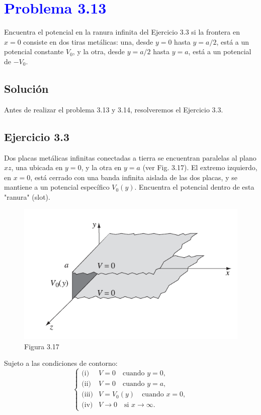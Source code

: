 \documentclass[12pt]{article}
\newcommand{\question}[1]{\textcolor{blue}{\textbf{#1}}}
\begin{document}


\section*{\question{Problema 3.13}}

Encuentra el potencial en la ranura infinita del Ejercicio 3.3 si la frontera en \(x=0\) consiste en dos tiras metálicas: una, desde \(y=0\) hasta \(y=a/2\), está a un potencial constante \( V_0\), y la otra, desde \(y=a/2\) hasta \(y=a\), está a un potencial de \( -V_0 \).

\subsection*{Solución}
Antes de realizar el problema 3.13 y 3.14, resolveremos el Ejercicio 3.3.

\subsection*{Ejercicio 3.3}
Dos placas metálicas infinitas conectadas a tierra se encuentran paralelas al plano \(xz\), una ubicada en \(y=0\), y la otra en \(y=a\) (ver Fig. 3.17). El extremo izquierdo, en \(x=0\), está cerrado con una banda infinita aislada de las dos placas, y se mantiene a un potencial específico \( V_0(y)\). Encuentra el potencial dentro de esta "ranura" (slot).

\begin{figure}[h]
    \centering
    \includegraphics[width=0.75\linewidth]{imagenes/Fig 3.17.PNG}
    \caption*{Figura 3.17}
    \label{fig:enter-label}
\end{figure}

Sujeto a las condiciones de contorno:
\[
\left\{
\begin{array}{ll}
\text{(i)} & V = 0 \quad \text{cuando } y = 0, \\
\text{(ii)} & V = 0 \quad \text{cuando } y = a, \\
\text{(iii)} & V = V_0(y) \quad \text{cuando } x = 0, \\
\text{(iv)} & V \to 0 \quad \text{si } x \to \infty.
\end{array}
\right.
\]
\end{document}
